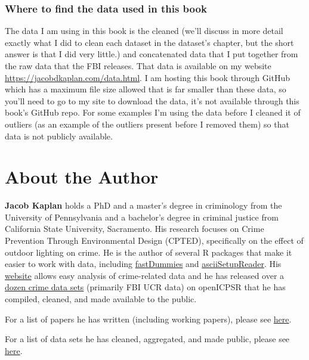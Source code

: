 \documentclass[
  12pt,
  openany]{book}
\begin{document}
\hypertarget{where-to-find-the-data-used-in-this-book}{%
\subsection{Where to find the data used in this book}\label{where-to-find-the-data-used-in-this-book}}

The data I am using in this book is the cleaned (we'll discuss in more detail exactly what I did to clean each dataset in the dataset's chapter, but the short answer is that I did very little.) and concatenated data that I put together from the raw data that the FBI releases. That data is available on my website \href{here}{https://jacobdkaplan.com/data.html}. I am hosting this book through GitHub which has a maximum file size allowed that is far smaller than these data, so you'll need to go to my site to download the data, it's not available through this book's GitHub repo. For some examples I'm using the data before I cleaned it of outliers (as an example of the outliers present before I removed them) so that data is not publicly available.

\hypertarget{about-the-author}{%
\chapter*{About the Author}\label{about-the-author}}


\textbf{Jacob Kaplan} holds a PhD and a master's degree in criminology from the University of Pennsylvania and a bachelor's degree in criminal justice from California State University, Sacramento. His research focuses on Crime Prevention Through Environmental Design (CPTED), specifically on the effect of outdoor lighting on crime. He is the author of several R packages that make it easier to work with data, including \href{https://jacobkap.github.io/fastDummies/}{fastDummies} and \href{https://jacobkap.github.io/asciiSetupReader/}{asciiSetupReader}. His \href{http://jacobdkaplan.com/}{website} allows easy analysis of crime-related data and he has released over a \href{http://jacobdkaplan.com/data.html}{dozen crime data sets} (primarily FBI UCR data) on openICPSR that he has compiled, cleaned, and made available to the public.

For a list of papers he has written (including working papers), please see \href{http://jacobdkaplan.com/research.html}{here}.

For a list of data sets he has cleaned, aggregated, and made public, please see \href{http://jacobdkaplan.com/data.html}{here}.
\end{document}
